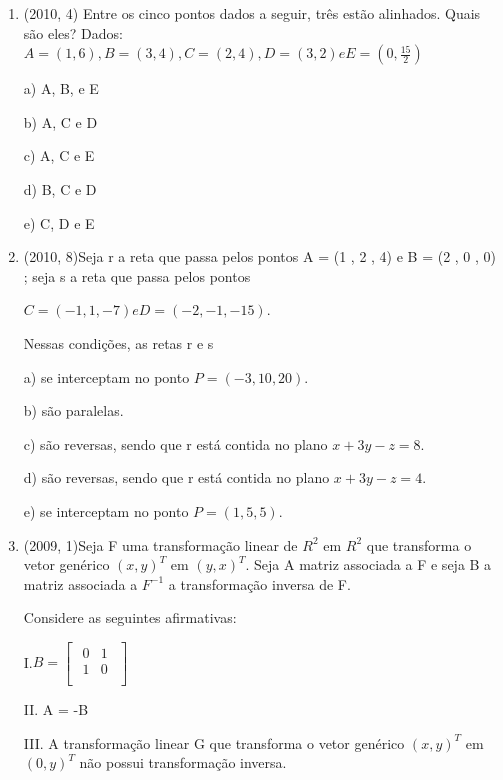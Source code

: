 \documentclass{article}
\begin{document}
\begin{enumerate}
\item(2010, 4)
Entre os cinco pontos dados a seguir, três estão alinhados. Quais são eles?
Dados: $A = (1 , 6) , B = (3 , 4) , C = (2 , 4) , D = (3 , 2) e E = (0 , \frac{15}{2} )$

a) A, B, e E

b) A, C e D

c) A, C e E

d) B, C e D

e) C, D e E\newline




\item(2010, 8)Seja r a reta que passa pelos pontos A = (1 , 2 , 4) e B = (2 , 0 , 0) ; seja s a reta que passa pelos pontos

$C = (-1 , 1 , -7) e D = (-2 , -1 , -15) .$

Nessas condições, as retas r e s

a) se interceptam no ponto $P = (-3 , 10 , 20)$.

b) são paralelas.

c) são reversas, sendo que r está contida no plano $x + 3 y - z = 8$.

d) são reversas, sendo que r está contida no plano $x + 3 y - z = 4$.

e) se interceptam no ponto $P = (1 , 5 , 5)$.







\item(2009, 1)Seja F uma transformação linear de $R^2$ em $R^2$ que transforma o vetor genérico $(x,y)^T$ em $(y,x)^T$. Seja A matriz associada a F e seja B a matriz associada a $F^{-1}$ a transformação inversa de F.

Considere as seguintes afirmativas:

I.$
B = \left [ \begin{matrix} 
    \begin{array}{cccc}
    0 & 1  \\
    1 & 0  \\
\end{array}
\end{matrix} \right ]$ \newline

II. A = -B\newline

III. A transformação linear G que transforma o vetor genérico $(x,y)^T$ em $(0,y)^T$ não possui transformação inversa.\newline


\end{enumerate}
\end{document}
